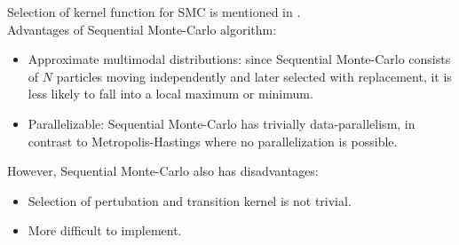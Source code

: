Selection of kernel function for SMC is mentioned in \cite{silk2012optimizing}.\\
Advantages of Sequential Monte-Carlo algorithm:
\begin{itemize}
    \item Approximate multimodal distributions: since Sequential Monte-Carlo consists of $N$
          particles moving independently and later selected with replacement, it is less likely to fall
          into a local maximum or minimum.
    \item Parallelizable: Sequential Monte-Carlo has trivially data-parallelism, in contrast to
          Metropolis-Hastings where no parallelization is possible.
\end{itemize}
However, Sequential Monte-Carlo also has disadvantages:
\begin{itemize}
    \item Selection of pertubation and transition kernel is not trivial.
    \item More difficult to implement.
\end{itemize}

